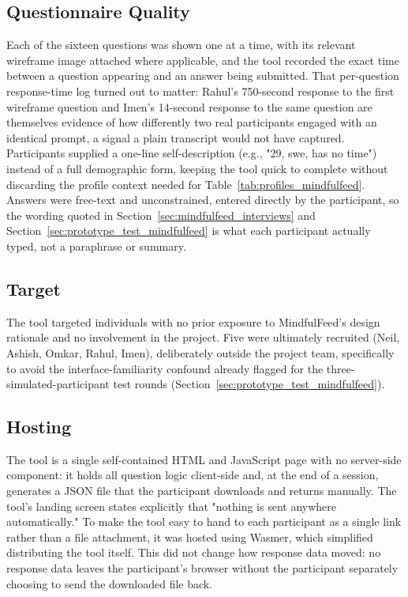 \documentclass[11pt]{article}
\begin{document}
\subsection{Questionnaire Quality}
Each of the sixteen questions was shown one at a time, with its relevant wireframe image attached where applicable, and the tool recorded the exact time between a question appearing and an answer being submitted. That per-question response-time log turned out to matter: Rahul's 750-second response to the first wireframe question and Imen's 14-second response to the same question are themselves evidence of how differently two real participants engaged with an identical prompt, a signal a plain transcript would not have captured. Participants supplied a one-line self-description (e.g., "29, swe, has no time") instead of a full demographic form, keeping the tool quick to complete without discarding the profile context needed for Table~\ref{tab:profiles_mindfulfeed}. Answers were free-text and unconstrained, entered directly by the participant, so the wording quoted in Section~\ref{sec:mindfulfeed_interviews} and Section~\ref{sec:prototype_test_mindfulfeed} is what each participant actually typed, not a paraphrase or summary.

\subsection{Target}
The tool targeted individuals with no prior exposure to MindfulFeed's design rationale and no involvement in the project. Five were ultimately recruited (Neil, Ashish, Omkar, Rahul, Imen), deliberately outside the project team, specifically to avoid the interface-familiarity confound already flagged for the three-simulated-participant test rounds (Section~\ref{sec:prototype_test_mindfulfeed}).

\subsection{Hosting}
The tool is a single self-contained HTML and JavaScript page with no server-side component: it holds all question logic client-side and, at the end of a session, generates a JSON file that the participant downloads and returns manually. The tool's landing screen states explicitly that "nothing is sent anywhere automatically." To make the tool easy to hand to each participant as a single link rather than a file attachment, it was hosted using Wasmer, which simplified distributing the tool itself. This did not change how response data moved: no response data leaves the participant's browser without the participant separately choosing to send the downloaded file back.
\end{document}
